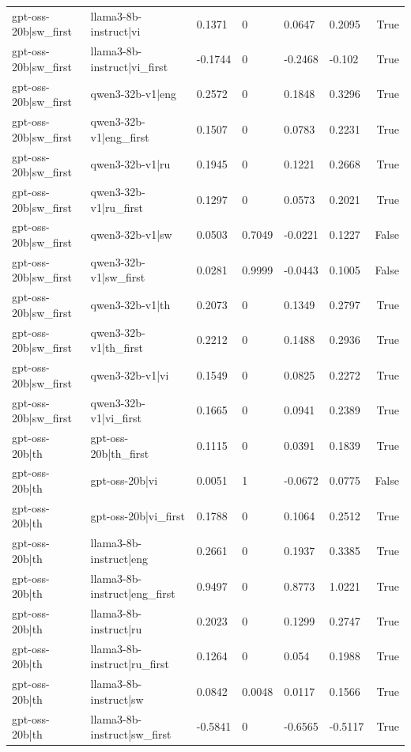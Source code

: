 \begin{table}
\begin{tabular}{llllllr}
gpt-oss-20b|sw_first & llama3-8b-instruct|vi & 0.1371 & 0 & 0.0647 & 0.2095 & True \\
gpt-oss-20b|sw_first & llama3-8b-instruct|vi_first & -0.1744 & 0 & -0.2468 & -0.102 & True \\
gpt-oss-20b|sw_first & qwen3-32b-v1|eng & 0.2572 & 0 & 0.1848 & 0.3296 & True \\
gpt-oss-20b|sw_first & qwen3-32b-v1|eng_first & 0.1507 & 0 & 0.0783 & 0.2231 & True \\
gpt-oss-20b|sw_first & qwen3-32b-v1|ru & 0.1945 & 0 & 0.1221 & 0.2668 & True \\
gpt-oss-20b|sw_first & qwen3-32b-v1|ru_first & 0.1297 & 0 & 0.0573 & 0.2021 & True \\
gpt-oss-20b|sw_first & qwen3-32b-v1|sw & 0.0503 & 0.7049 & -0.0221 & 0.1227 & False \\
gpt-oss-20b|sw_first & qwen3-32b-v1|sw_first & 0.0281 & 0.9999 & -0.0443 & 0.1005 & False \\
gpt-oss-20b|sw_first & qwen3-32b-v1|th & 0.2073 & 0 & 0.1349 & 0.2797 & True \\
gpt-oss-20b|sw_first & qwen3-32b-v1|th_first & 0.2212 & 0 & 0.1488 & 0.2936 & True \\
gpt-oss-20b|sw_first & qwen3-32b-v1|vi & 0.1549 & 0 & 0.0825 & 0.2272 & True \\
gpt-oss-20b|sw_first & qwen3-32b-v1|vi_first & 0.1665 & 0 & 0.0941 & 0.2389 & True \\
gpt-oss-20b|th & gpt-oss-20b|th_first & 0.1115 & 0 & 0.0391 & 0.1839 & True \\
gpt-oss-20b|th & gpt-oss-20b|vi & 0.0051 & 1 & -0.0672 & 0.0775 & False \\
gpt-oss-20b|th & gpt-oss-20b|vi_first & 0.1788 & 0 & 0.1064 & 0.2512 & True \\
gpt-oss-20b|th & llama3-8b-instruct|eng & 0.2661 & 0 & 0.1937 & 0.3385 & True \\
gpt-oss-20b|th & llama3-8b-instruct|eng_first & 0.9497 & 0 & 0.8773 & 1.0221 & True \\
gpt-oss-20b|th & llama3-8b-instruct|ru & 0.2023 & 0 & 0.1299 & 0.2747 & True \\
gpt-oss-20b|th & llama3-8b-instruct|ru_first & 0.1264 & 0 & 0.054 & 0.1988 & True \\
gpt-oss-20b|th & llama3-8b-instruct|sw & 0.0842 & 0.0048 & 0.0117 & 0.1566 & True \\
gpt-oss-20b|th & llama3-8b-instruct|sw_first & -0.5841 & 0 & -0.6565 & -0.5117 & True \\

\end{tabular}
\end{table}
